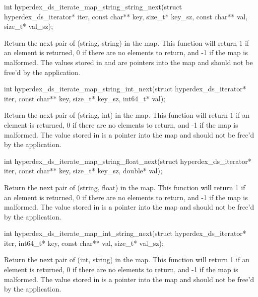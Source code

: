 \begin{ccode}
int hyperdex_ds_iterate_map_string_string_next(struct hyperdex_ds_iterator* iter,
                                               const char** key, size_t* key_sz,
                                               const char** val, size_t* val_sz);
\end{ccode}
Return the next pair of (string, string) in the map.  This function
will return 1 if an element is returned, 0 if there are no elements to return,
and -1 if the map is malformed.  The values stored in  and
 are pointers into the map and should not be free'd by the
application.

\begin{ccode}
int hyperdex_ds_iterate_map_string_int_next(struct hyperdex_ds_iterator* iter,
                                            const char** key, size_t* key_sz,
                                            int64_t* val);
\end{ccode}
Return the next pair of (string, int) in the map.  This function will
return 1 if an element is returned, 0 if there are no elements to return, and -1
if the map is malformed.  The value stored in  is a pointer into the
map and should not be free'd by the application.

\begin{ccode}
int hyperdex_ds_iterate_map_string_float_next(struct hyperdex_ds_iterator* iter,
                                              const char** key, size_t* key_sz,
                                              double* val);
\end{ccode}
Return the next pair of (string, float) in the map.  This function
will return 1 if an element is returned, 0 if there are no elements to return,
and -1 if the map is malformed.  The value stored in  is a pointer
into the map and should not be free'd by the application.

\begin{ccode}
int hyperdex_ds_iterate_map_int_string_next(struct hyperdex_ds_iterator* iter,
                                            int64_t* key,
                                            const char** val, size_t* val_sz);
\end{ccode}
Return the next pair of (int, string) in the map.  This function will
return 1 if an element is returned, 0 if there are no elements to return, and -1
if the map is malformed.  The value stored in  is a pointer into the
map and should not be free'd by the application.

